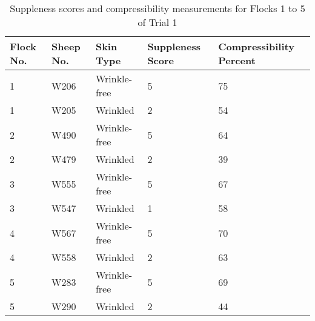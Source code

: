 %

\begin{table}[htp]
\centering
\caption{Suppleness scores and compressibility measurements for Flocks 1 to 5 of Trial 1}
\label{tab:macro}
\vspace{0.1in}
\begin{tabular}{|p{0.6in}|p{0.6in}|p{0.8in}|p{0.8in}|p{0.9in}|}  \hline
     Flock No. & Sheep No.  &  Skin Type & Suppleness Score & Compressibility Percent \\ 
\hline
  1 & W206 & Wrinkle-free & 5 & 75 \\
  1 & W205 & Wrinkled     & 2 & 54 \\
  2 & W490 & Wrinkle-free & 5 & 64 \\
  2 & W479 & Wrinkled     & 2 & 39 \\
  3 & W555 & Wrinkle-free & 5 & 67 \\
  3 & W547 & Wrinkled     & 1 & 58 \\
  4 & W567 & Wrinkle-free & 5 & 70 \\
  4 & W558 & Wrinkled     & 2 & 63 \\
  5 & W283 & Wrinkle-free & 5 & 69 \\
  5 & W290 & Wrinkled     & 2 & 44 \\ \hline
\end{tabular}
\end{table}

%
